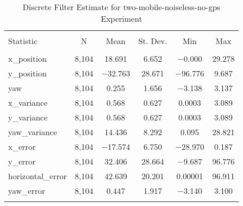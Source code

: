 
\begin{table}[h] \centering 
  \caption{Discrete Filter Estimate for two-mobile-noiseless-no-gps Experiment} 
  \label{tab:two_mobile_noiseless_no_gps_discrete_summary} 
\begin{tabular}{@{\extracolsep{5pt}}lccccc} 
\\[-1.8ex]\hline 
\hline \\[-1.8ex] 
Statistic & \multicolumn{1}{c}{N} & \multicolumn{1}{c}{Mean} & \multicolumn{1}{c}{St. Dev.} & \multicolumn{1}{c}{Min} & \multicolumn{1}{c}{Max} \\ 
\hline \\[-1.8ex] 
x\_position & 8,104 & 18.691 & 6.652 & $-$0.000 & 29.278 \\ 
y\_position & 8,104 & $-$32.763 & 28.671 & $-$96.776 & 9.687 \\ 
yaw & 8,104 & 0.255 & 1.656 & $-$3.138 & 3.137 \\ 
x\_variance & 8,104 & 0.568 & 0.627 & 0.0003 & 3.089 \\ 
y\_variance & 8,104 & 0.568 & 0.627 & 0.0003 & 3.089 \\ 
yaw\_variance & 8,104 & 14.436 & 8.292 & 0.095 & 28.821 \\ 
x\_error & 8,104 & $-$17.574 & 6.750 & $-$28.970 & 0.187 \\ 
y\_error & 8,104 & 32.406 & 28.664 & $-$9.687 & 96.776 \\ 
horizontal\_error & 8,104 & 42.639 & 20.201 & 0.00001 & 96.911 \\ 
yaw\_error & 8,104 & 0.447 & 1.917 & $-$3.140 & 3.100 \\ 
\hline \\[-1.8ex] 
\end{tabular} 
\end{table} 
